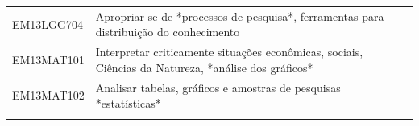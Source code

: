 \documentclass[12pt]{extarticle}
\begin{document}
\begin{longtable}{ll}
EM13LGG704 & Apropriar-se de *processos de pesquisa*, ferramentas para distribuição do conhecimento                                                                                                                                                                                                                                                                                                                                                                                                                                                                                                                                                                                                                                                                                                                                \\
\rowcolor[HTML]{FFF} 
EM13MAT101 & Interpretar criticamente situações econômicas, sociais, Ciências da Natureza, *análise dos gráficos*                                                                                                                                                                                                                                                                                                                                                                                                                                                                                                                                                                                                                                                                                                                  \\
\rowcolor[HTML]{E0F7FA} 
EM13MAT102 & Analisar tabelas, gráficos e amostras de pesquisas *estatísticas*                                                                                                                                                                                                                                                                                                                                                                                                                                                                                                                                                                                                                                                                                                                                                     \\
\rowcolor[HTML]{FFF} 

\end{longtable}
\end{document}
